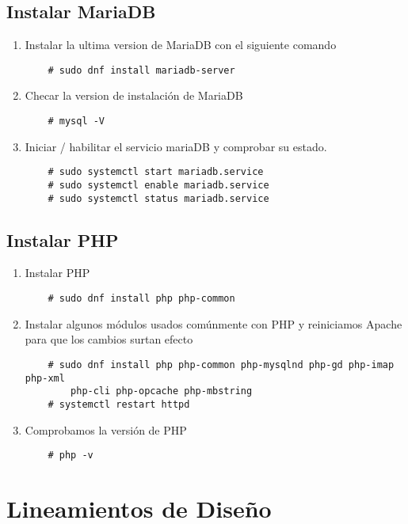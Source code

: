 \subsection{Instalar MariaDB}
\begin{enumerate}
    \item Instalar la ultima version de MariaDB con el siguiente comando
    \begin{lstlisting}
    # sudo dnf install mariadb-server
    \end{lstlisting}
    \item Checar la version de instalación de MariaDB
    \begin{lstlisting}
    # mysql -V
    \end{lstlisting}
    \item Iniciar / habilitar el servicio mariaDB y comprobar su estado.
    \begin{lstlisting}
    # sudo systemctl start mariadb.service
    # sudo systemctl enable mariadb.service
    # sudo systemctl status mariadb.service
    \end{lstlisting}
\end{enumerate}

\subsection{Instalar PHP}
\begin{enumerate}
    \item Instalar PHP
    \begin{lstlisting}
    # sudo dnf install php php-common
    \end{lstlisting}
    \item Instalar algunos módulos usados comúnmente con PHP y reiniciamos Apache para que los cambios surtan efecto
    \begin{lstlisting}
    # sudo dnf install php php-common php-mysqlnd php-gd php-imap php-xml 
        php-cli php-opcache php-mbstring
    # systemctl restart httpd
    \end{lstlisting}
    \item Comprobamos la versión de PHP
    \begin{lstlisting}
    # php -v
    \end{lstlisting}
\end{enumerate}

\section{Lineamientos de Diseño}


